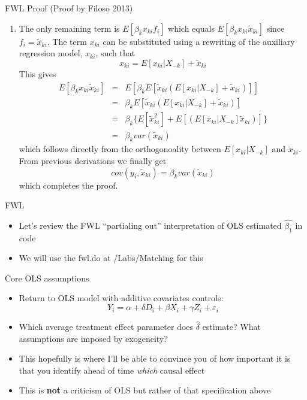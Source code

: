 \documentclass{beamer}
\begin{document}
\begin{frame}[plain, shrink=25]

	\begin{block}{FWL Proof  (Proof by Filoso 2013)}
		\begin{enumerate}\addtocounter{enumi}{3}
		\item The only remaining term is $E[\beta_kx_{ki}f_i]$ which equals $E[\beta_kx_{ki}\tilde{x}_{ki}]$ since $f_i=\tilde{x}_{ki}$. The term $x_{ki}$ can be substituted using a rewriting of the auxiliary regression model, $x_{ki}$, such that$$x_{ki} = E[x_{ki} | X_{-k}] + \tilde{x}_{ki}$$This gives
			\begin{eqnarray*}
			E[\beta_kx_{ki}\tilde{x}_{ki}] &=& E[\beta_kE[\tilde{x}_{ki}(E[x_{ki}|X_{-k}]+\tilde{x}_{ki})]] \\
			&=& \beta_kE[\tilde{x}_{ki}(E[x_{ki}|X_{-k}]+\tilde{x}_{ki})] \\
			&=&\beta_k\{E[\tilde{x}^2_{ki}] + E[(E[x_{ki}|X_{-k}]\tilde{x}_{ki})]\} \\
			&=& \beta_k var(\tilde{x}_{ki})
			\end{eqnarray*}which follows directly from the orthogonoality between $E[x_{ki} | X_{-k}]$ and $\tilde{x}_{ki}$. From previous derivations we finally get$$cov(y_i,\tilde{x}_{ki}) = \beta_kvar(\tilde{x}_{ki})$$which completes the proof. \qedhere
		\end{enumerate}
	\end{block}

\end{frame}

\begin{frame}{FWL}

\begin{itemize}
\item Let's review the FWL ``partialing out'' interpretation of OLS estimated $\widehat{\beta_1}$ in code
\item We will use the fwl.do at /Labs/Matching for this
\end{itemize}

\end{frame}



\begin{frame}{Core OLS assumptions}

\begin{itemize}
\item Return to OLS model with additive covariates  controls: $$Y_i = \alpha + \delta D_i + \beta X_i + \gamma Z_i + \varepsilon_i$$
\item Which average treatment effect parameter does $\widehat{\delta}$ estimate?  What assumptions are imposed by exogeneity?
\item This hopefully is where I'll be able to convince you of how important it is that you identify ahead of time \emph{which} causal effect
\item This is \textbf{not} a criticism of OLS but rather of that specification above
\end{itemize}

\end{frame}
\end{document}
